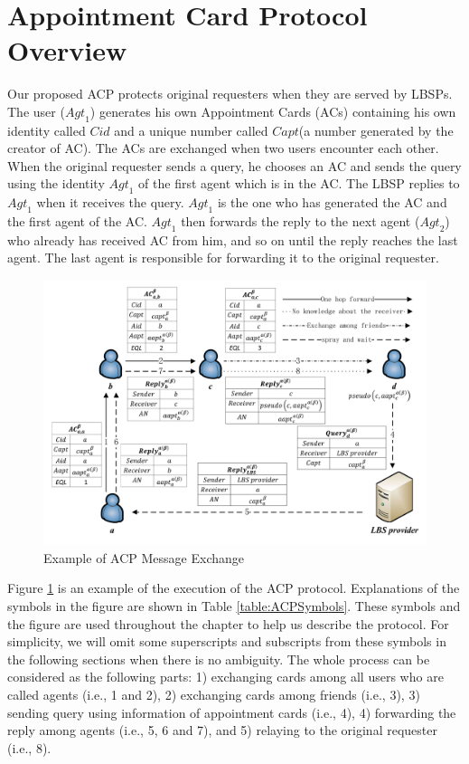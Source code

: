 \section{ Appointment Card Protocol Overview}

\noindent Our proposed ACP protects original requesters when they are served by LBSPs. The user (${Agt}_{1}$) generates his own Appointment Cards (ACs) containing his own identity called $Cid$ and a unique number called $Capt$(a number generated by the creator of AC). The ACs are exchanged when two users encounter each other. When the original requester sends a query, he chooses an AC and sends the query using the identity ${Agt}_{1}$ of the first agent which is in the AC. The LBSP replies to ${Agt}_{1}$ when it receives the query. ${Agt}_{1}$ is the one who has generated the AC and the first agent of the AC. ${Agt}_{1}$ then forwards the reply to the next agent (${Agt}_{2}$) who already has received AC from him, and so on until the reply reaches the last agent. The last agent is responsible for forwarding it to the original requester.

\begin{figure} [H]
  \centering 
  \includegraphics[width=6.0in]{figures/FIG_4_1_Example_of_ACP_Message_Exchange.png}
  \caption{Example of ACP Message Exchange} 
  \label{fig:EoACPME} %
\end{figure}


Figure \ref{fig:EoACPME} is an example of the execution of the ACP protocol. Explanations of the symbols in the figure are shown in Table \ref{table:ACPSymbols}. These symbols and the figure are used throughout the chapter to help us describe the protocol. For simplicity, we will omit some superscripts and subscripts from these symbols in the following sections when there is no ambiguity. The whole process can be considered as the following parts: 1) exchanging cards among all users who are called agents (i.e., 1 and 2), 2) exchanging cards among friends (i.e., 3), 3) sending query using information of appointment cards (i.e., 4), 4) forwarding the reply among agents (i.e., 5, 6 and 7), and 5) relaying to the original requester (i.e., 8). 


